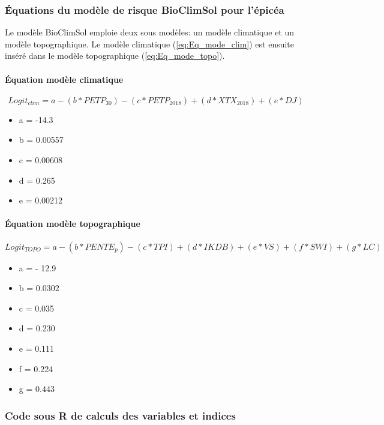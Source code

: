 \subsubsection{Équations du modèle de risque BioClimSol pour l'épicéa}

Le modèle BioClimSol emploie deux sous modèles: un modèle climatique et un modèle topographique. Le modèle climatique (\ref{eq:Eq_mode_clim}) est ensuite inséré dans le modèle topographique (\ref{eq:Eq_mode_topo}). 

\paragraph{Équation modèle climatique}


\begin{equation}\label{eq:Eq_mode_clim}
Logit_{clim} = a - (b* PETP_{30}) -(c*PETP_{2018})+ (d*XTX_{2018}) + (e* DJ)
\end{equation}
  
\begin{itemize}

\item a = -14.3
\item b = 0.00557 
\item c = 0.00608
\item d = 0.265
\item e = 0.00212

\end{itemize}  
\paragraph{Équation modèle topographique}
 
\begin{equation}\label{eq:Eq_mode_topo}
Logit_{TOPO} = a - (b* PENTE_{p}) -(c*TPI)+ (d*IKDB) + (e* VS) + (f*SWI) + (g*LC)
\end{equation}    
\begin{itemize}

\item a =  - 12.9 
\item b = 0.0302 
\item c = 0.035
\item d =  0.230
\item e =  0.111
\item f = 0.224
\item g = 0.443

\end{itemize}
\subsubsection{Code sous R de calculs des variables et indices}

